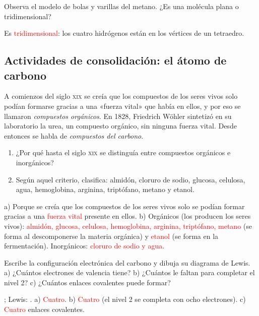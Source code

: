 \begin{exercise}
    Observa el modelo de bolas y varillas del metano. ¿Es una molécula plana o tridimensional?
    \begin{solu}
        Es \textcolor{red}{tridimensional}: los cuatro hidrógenos están en los vértices de un tetraedro.
    \end{solu}
\end{exercise}

\subsection*{Actividades de consolidación: el átomo de carbono}

\begin{exercise}
    A comienzos del siglo \textsc{xix} se creía que los compuestos de los seres vivos solo podían formarse gracias a una «fuerza vital» que había en ellos, y por eso se llamaron \emph{compuestos orgánicos}. En 1828, Friedrich Wöhler sintetizó en su laboratorio la urea, un compuesto orgánico, sin ninguna fuerza vital. Desde entonces se habla de \emph{compuestos del carbono}.
    \begin{enumerate}[label=\alph*)]
        \item ¿Por qué hasta el siglo \textsc{xix} se distinguía entre compuestos orgánicos e inorgánicos?
        \item Según aquel criterio, clasifica: almidón, cloruro de sodio, glucosa, celulosa, agua, hemoglobina, arginina, triptófano, metano y etanol.
    \end{enumerate}
    \begin{solu}
        a) Porque se creía que los compuestos de los seres vivos solo se podían formar gracias a una \textcolor{red}{fuerza vital} presente en ellos.
        b) Orgánicos (los producen los seres vivos): \textcolor{red}{almidón, glucosa, celulosa, hemoglobina, arginina, triptófano, metano} (se forma al descomponerse la materia orgánica) y \textcolor{red}{etanol} (se forma en la fermentación). Inorgánicos: \textcolor{red}{cloruro de sodio y agua}.
    \end{solu}
\end{exercise}

\begin{exercise}
    Escribe la configuración electrónica del carbono y dibuja su diagrama de Lewis. a) ¿Cuántos electrones de valencia tiene? b) ¿Cuántos le faltan para completar el nivel 2? c) ¿Cuántos enlaces covalentes puede formar?
    \begin{solu}
        ; Lewis: \quad{}\quad.
        a) \textcolor{red}{Cuatro}. b) \textcolor{red}{Cuatro} (el nivel 2 se completa con ocho electrones). c) \textcolor{red}{Cuatro} enlaces covalentes.
    \end{solu}
\end{exercise}

